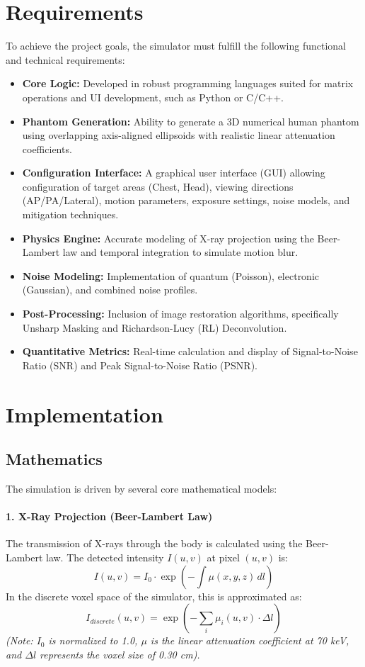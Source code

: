 \documentclass[12pt,a4paper]{article}
\begin{document}
\section{Requirements}
To achieve the project goals, the simulator must fulfill the following functional and technical requirements:
\begin{itemize}
    \item \textbf{Core Logic:} Developed in robust programming languages suited for matrix operations and UI development, such as Python or C/C++.
    \item \textbf{Phantom Generation:} Ability to generate a 3D numerical human phantom using overlapping axis-aligned ellipsoids with realistic linear attenuation coefficients.
    \item \textbf{Configuration Interface:} A graphical user interface (GUI) allowing configuration of target areas (Chest, Head), viewing directions (AP/PA/Lateral), motion parameters, exposure settings, noise models, and mitigation techniques.
    \item \textbf{Physics Engine:} Accurate modeling of X-ray projection using the Beer-Lambert law and temporal integration to simulate motion blur.
    \item \textbf{Noise Modeling:} Implementation of quantum (Poisson), electronic (Gaussian), and combined noise profiles.
    \item \textbf{Post-Processing:} Inclusion of image restoration algorithms, specifically Unsharp Masking and Richardson-Lucy (RL) Deconvolution.
    \item \textbf{Quantitative Metrics:} Real-time calculation and display of Signal-to-Noise Ratio (SNR) and Peak Signal-to-Noise Ratio (PSNR).
\end{itemize}

\section{Implementation}

\subsection{Mathematics}
The simulation is driven by several core mathematical models:

\paragraph{1. X-Ray Projection (Beer-Lambert Law)}
The transmission of X-rays through the body is calculated using the Beer-Lambert law. The detected intensity $I(u,v)$ at pixel $(u,v)$ is:
\[ I(u,v) = I_0 \cdot \exp\left( - \int \mu(x,y,z) \, dl \right) \]
In the discrete voxel space of the simulator, this is approximated as:
\[ I_{discrete}(u,v) = \exp\left( - \sum_{i} \mu_i(u,v) \cdot \Delta l \right) \]
\textit{(Note: $I_0$ is normalized to 1.0, $\mu$ is the linear attenuation coefficient at 70 keV, and $\Delta l$ represents the voxel size of 0.30 cm).}
\end{document}
